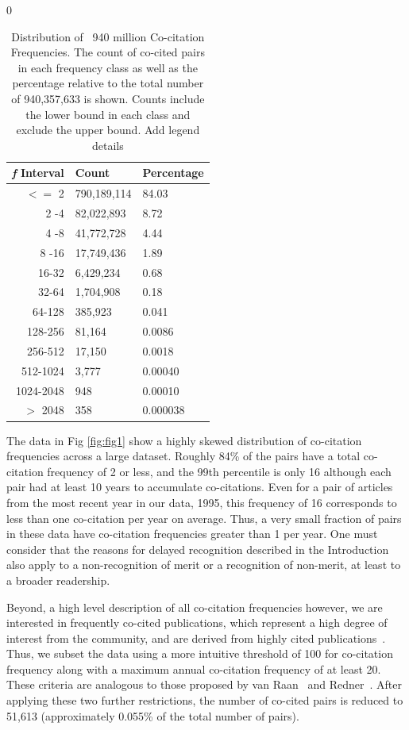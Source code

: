 \documentclass[utf8]{frontiersSCNS}
\begin{document}
\begin{table}[ht]
\caption{Distribution of ~940 million Co-citation Frequencies. The count of co-cited pairs in each frequency class as well as the percentage relative to the total number of 940,357,633 is shown. Counts include the lower bound in each class and exclude the upper bound. Add legend details}%
\centering %
\begin{center}0
\begin{tabular}{rll} 
\emph{f} Interval & Count & Percentage \\
\hline %
$<=$ 2 & 790,189,114 & 84.03 \\
2 -4 & 82,022,893 & 8.72 \\
4 -8 & 41,772,728 & 4.44 \\
8 -16 & 17,749,436 & 1.89 \\
16-32 & 6,429,234 & 0.68\\
32-64 & 1,704,908 & 0.18\\
64-128 & 385,923 & 0.041\\
128-256 & 81,164 & 0.0086\\ 
256-512 & 17,150 & 0.0018\\
512-1024 & 3,777 & 0.00040\\
1024-2048 & 948 & 0.00010\\ 
$> $ 2048 & 358 & 0.000038\\   
\hline 
\end{tabular}
\end{center}
\label{tab:table1} %
\end{table}


The data in Fig \ref{fig:fig1} show a highly skewed distribution of co-citation frequencies across a large dataset. Roughly 84\% of the pairs have a total co-citation frequency of 2 or less, and the 99th percentile is only 16 although each pair had at least 10 years to accumulate co-citations. Even for a pair of articles from the most recent year in our data, 1995, this frequency of 16 corresponds to less than one co-citation per year on average. Thus, a very small fraction of pairs in these data have co-citation frequencies greater than 1 per year. One must consider that the reasons for delayed recognition described in the Introduction also apply to a non-recognition of merit or a recognition of non-merit, at least to a broader readership.

Beyond, a high level description of all co-citation frequencies however, we are interested in frequently co-cited publications, which represent a high degree of interest from the community, and are derived from highly cited publications~\citep{Small1973}. Thus, we subset the data using a more intuitive threshold of 100 for co-citation frequency along with a maximum annual co-citation frequency of at least 20. These criteria are analogous to those proposed by van Raan~\citep{Raan2004} and Redner~\citep{redner_2005}. After applying these two further restrictions, the number of co-cited pairs is reduced to 51,613 (approximately 0.055\% of the total number of pairs).
\end{document}
